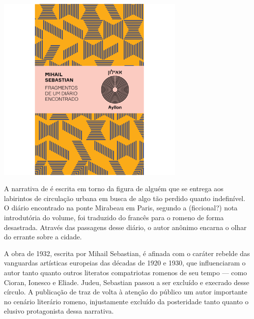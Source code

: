 \pagebreak %

\begin{center}
\hspace*{-2.5cm}
\hspace*{2.5cm}\includegraphics[width=92mm]{./grid/sebastian.jpg}
\end{center}

\hspace*{-7cm}\hrulefill\hspace*{-7cm}

\medskip

\noindent{}A narrativa de {} é escrita em torno da figura de alguém que se entrega aos labirintos de circulação urbana em busca de algo tão perdido quanto indefinível. O diário encontrado na ponte Mirabeau em Paris, segundo a (ficcional?) nota introdutória do volume, foi traduzido do francês para o romeno de forma desastrada. Através das passagens desse diário, o autor anônimo encarna o olhar do errante sobre a cidade.

A obra de 1932, escrita por Mihail Sebastian, é afinada com o caráter rebelde das vanguardas artísticas europeias das décadas de 1920 e 1930, que influenciaram o autor tanto quanto outros literatos compatriotas romenos de seu tempo --- como Cioran, Ionesco e Eliade. Judeu, Sebastian passou a ser excluído e execrado desse círculo. A publicação de {} traz de volta à atenção do público um autor importante no cenário literário romeno, injustamente excluído da posteridade tanto quanto o elusivo protagonista dessa narrativa.


